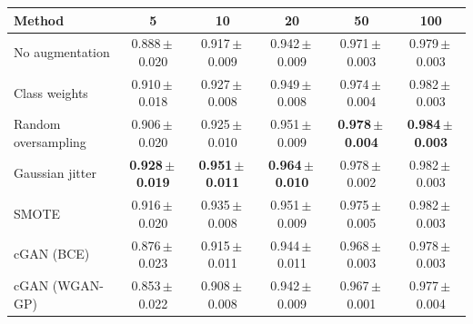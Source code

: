 \begin{tabular}{lccccc}
\toprule
\textbf{Method} & \textbf{5} & \textbf{10} & \textbf{20} & \textbf{50} & \textbf{100}\\
\midrule
No augmentation & 0.888\,$\pm$\,0.020 & 0.917\,$\pm$\,0.009 & 0.942\,$\pm$\,0.009 & 0.971\,$\pm$\,0.003 & 0.979\,$\pm$\,0.003\\
Class weights & 0.910\,$\pm$\,0.018 & 0.927\,$\pm$\,0.008 & 0.949\,$\pm$\,0.008 & 0.974\,$\pm$\,0.004 & 0.982\,$\pm$\,0.003\\
Random oversampling & 0.906\,$\pm$\,0.020 & 0.925\,$\pm$\,0.010 & 0.951\,$\pm$\,0.009 & \textbf{0.978\,$\pm$\,0.004} & \textbf{0.984\,$\pm$\,0.003}\\
Gaussian jitter & \textbf{0.928\,$\pm$\,0.019} & \textbf{0.951\,$\pm$\,0.011} & \textbf{0.964\,$\pm$\,0.010} & 0.978\,$\pm$\,0.002 & 0.982\,$\pm$\,0.003\\
SMOTE & 0.916\,$\pm$\,0.020 & 0.935\,$\pm$\,0.008 & 0.951\,$\pm$\,0.009 & 0.975\,$\pm$\,0.005 & 0.982\,$\pm$\,0.003\\
cGAN (BCE) & 0.876\,$\pm$\,0.023 & 0.915\,$\pm$\,0.011 & 0.944\,$\pm$\,0.011 & 0.968\,$\pm$\,0.003 & 0.978\,$\pm$\,0.003\\
cGAN (WGAN-GP) & 0.853\,$\pm$\,0.022 & 0.908\,$\pm$\,0.008 & 0.942\,$\pm$\,0.009 & 0.967\,$\pm$\,0.001 & 0.977\,$\pm$\,0.004\\\bottomrule
\end{tabular}
